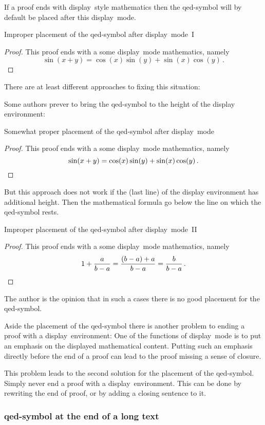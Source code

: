 If a proof ends with display~style mathematics then the qed-symbol will by default be placed after this display~mode.
\begin{showlatex}{Improper placement of the qed-symbol after display~mode~I}
\begin{proof}
  This proof ends with a some display~mode mathematics, namely
  \[
    \sin(x+y)
    =
    \cos(x)\sin(y) + \sin(x)\cos(y) \,.
  \]
\end{proof}
\end{showlatex}
There are at least different approaches to fixing this situation:

Some authors prever to bring the qed-symbol to the height of the display environment:
\begin{showlatex}{Somewhat proper placement of the qed-symbol after display~mode}
\begin{proof}
  This proof ends with a some display~mode mathematics, namely
  \[
    \sin(x+y)
    =
    \cos(x)\sin(y) + \sin(x)\cos(y) \,.
    \qedhere
  \]
\end{proof}
\end{showlatex}
But this approach does not work if the (last line) of the display environment has additional height.
Then the mathematical formula go below the line on which the qed-symbol rests.
\begin{showlatex}{Improper placement of the qed-symbol after display~mode~II}
\begin{proof}
  This proof ends with a some display~mode mathematics, namely
  \[
    1
    + \frac{a}{b - a}
    =
    \frac{(b - a) + a}{b - a}
    =
    \frac{b}{b - a} \,.
    \qedhere
  \]
\end{proof}
\end{showlatex}
The author is the opinion that in such a cases there is no good placement for the qed-symbol.

Aside the placement of the qed-symbol there is another problem to ending a proof with a display~environment:
One of the functions of display~mode is to put an emphasis on the displayed mathematical content.
Putting such an emphasis directly before the end of a proof can lead to the proof missing a sense of closure.

This problem leads to the second solution for the placement of the qed-symbol.
Simply never end a proof with a display~environment.
This can be done by rewriting the end of proof, or by adding a closing sentence to it.

\subsubsection{qed-symbol at the end of a long text}

